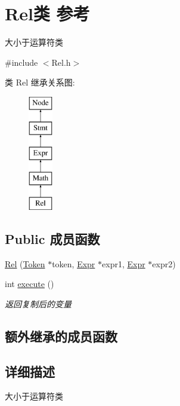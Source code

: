 \hypertarget{class_rel}{}\section{Rel类 参考}
\label{class_rel}


大小于运算符类  




{\ttfamily \#include $<$Rel.\+h$>$}

类 Rel 继承关系图\+:\begin{figure}[H]
\begin{center}
\leavevmode
\includegraphics[height=5.000000cm]{class_rel}
\end{center}
\end{figure}
\subsection*{Public 成员函数}
\begin{DoxyCompactItemize}
\item 
\hyperlink{class_rel_a1f60bc90adde19ed35f26ea8b2cfd91c}{Rel} (\hyperlink{class_token}{Token} $\ast$token, \hyperlink{class_expr}{Expr} $\ast$expr1, \hyperlink{class_expr}{Expr} $\ast$expr2)
\item 
int \hyperlink{class_rel_a82b2f3b75a2b9e81631f2659d42a36d1}{execute} ()\hypertarget{class_rel_a82b2f3b75a2b9e81631f2659d42a36d1}{}\label{class_rel_a82b2f3b75a2b9e81631f2659d42a36d1}

\begin{DoxyCompactList}\small\item\em 返回复制后的变量 \end{DoxyCompactList}\end{DoxyCompactItemize}
\subsection*{额外继承的成员函数}


\subsection{详细描述}
大小于运算符类 


